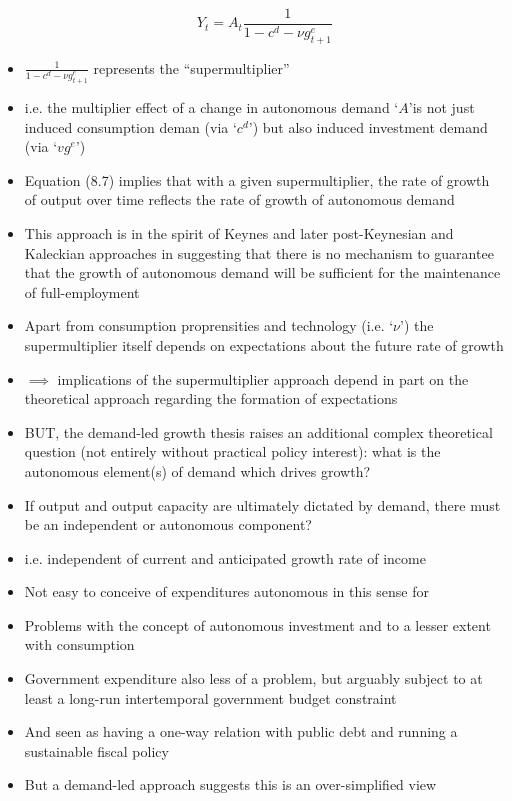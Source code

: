 \documentclass[a4paper,twoside]{article}
\newcommand{\myuline}[1]{%
	\uline{\phantom{#1}}%
	\llap{\contour{white}{#1}}%
}
\numberwithin{equation}{section}
\numberwithin{figure}{section}
\begin{document}
\begin{itemize}
	\begin{equation}
		Y_t = A_t \frac{1}{1 - c^d - \nu g_{t+1}^e} \label{eq:8.7}
	\end{equation}
	\item \( \frac{1}{1 - c^d - \nu g_{t+1}^e} \) represents the ``supermultiplier''
	\item i.e. the multiplier effect of a change in autonomous demand `\( A \)'is not just induced consumption deman (via `\( c^d \)') but also induced investment demand (via `\( v g^e \)')
	\item Equation (8.7) implies that with a given supermultiplier, the rate of growth of output over time reflects the rate of growth of autonomous demand
	\item This approach is in the spirit of Keynes and later post-Keynesian and Kaleckian approaches in suggesting that there is no mechanism to guarantee that the growth of autonomous demand will be sufficient for the maintenance of full-employment
	\item Apart from consumption proprensities and technology (i.e. `\( \nu \)') the supermultiplier itself depends on expectations about the future rate of growth
	\item \( \implies \) implications of the supermultiplier approach depend in part on the theoretical approach regarding the formation of expectations
	\item BUT, the demand-led growth thesis raises an additional  complex theoretical question (not entirely without practical policy interest): what is the autonomous element(s) of demand which drives growth?
	\item If output and output capacity are ultimately dictated by demand, there must be an independent or autonomous component?
	\item i.e. independent of current and anticipated growth rate of income
	\item Not easy to conceive of expenditures autonomous in this sense for \myuline{all time}
	\item Problems with the concept of autonomous investment and to a lesser extent with consumption
	\item Government expenditure also less of a problem, but arguably subject to at least a long-run intertemporal government budget constraint
	\item And seen as having a one-way relation with public debt and running a sustainable fiscal policy
	\item But a demand-led approach suggests this is an over-simplified view

\end{itemize}
\end{document}
